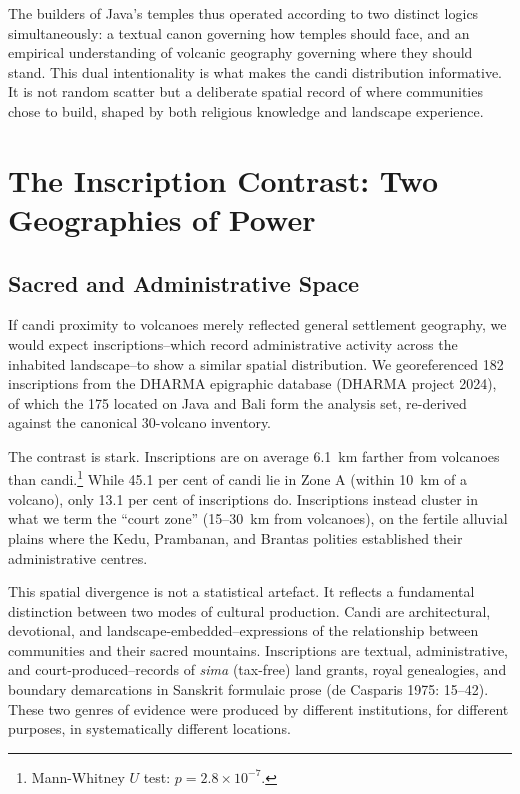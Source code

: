 \documentclass[12pt,a4paper]{article}
\begin{document}
The builders of Java's temples thus operated according to two distinct logics simultaneously: a textual canon governing how temples should face, and an empirical understanding of volcanic geography governing where they should stand.
This dual intentionality is what makes the candi distribution informative.
It is not random scatter but a deliberate spatial record of where communities chose to build, shaped by both religious knowledge and landscape experience.


\section{The Inscription Contrast: Two Geographies of Power}

\subsection{Sacred and Administrative Space}

If candi proximity to volcanoes merely reflected general settlement geography, we would expect inscriptions--which record administrative activity across the inhabited landscape--to show a similar spatial distribution.
We georeferenced 182 inscriptions from the DHARMA epigraphic database (DHARMA project 2024), of which the 175 located on Java and Bali form the analysis set, re-derived against the canonical 30-volcano inventory.

The contrast is stark.
Inscriptions are on average 6.1~km farther from volcanoes than candi.\footnote{Mann-Whitney $U$ test: $p = 2.8 \times 10^{-7}$.}
While 45.1 per cent of candi lie in Zone A (within 10~km of a volcano), only 13.1 per cent of inscriptions do.
Inscriptions instead cluster in what we term the ``court zone'' (15--30~km from volcanoes), on the fertile alluvial plains where the Kedu, Prambanan, and Brantas polities established their administrative centres.

This spatial divergence is not a statistical artefact.
It reflects a fundamental distinction between two modes of cultural production.
Candi are architectural, devotional, and landscape-embedded--expressions of the relationship between communities and their sacred mountains.
Inscriptions are textual, administrative, and court-produced--records of \emph{sima} (tax-free) land grants, royal genealogies, and boundary demarcations in Sanskrit formulaic prose (de Casparis 1975: 15--42).
These two genres of evidence were produced by different institutions, for different purposes, in systematically different locations.
\end{document}
